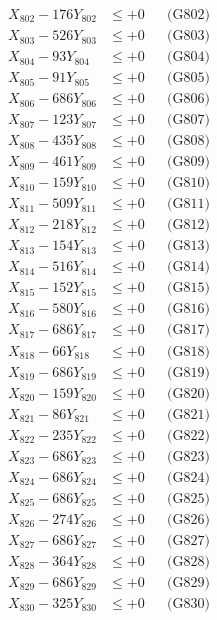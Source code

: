 \documentclass[a4paper,10pt]{article}
\begin{document}
{\begin{align}
X_{802} - 176Y_{802} &\leq +0 && \text{(G802)} \\
X_{803} - 526Y_{803} &\leq +0 && \text{(G803)} \\
X_{804} - 93Y_{804} &\leq +0 && \text{(G804)} \\
X_{805} - 91Y_{805} &\leq +0 && \text{(G805)} \\
X_{806} - 686Y_{806} &\leq +0 && \text{(G806)} \\
X_{807} - 123Y_{807} &\leq +0 && \text{(G807)} \\
X_{808} - 435Y_{808} &\leq +0 && \text{(G808)} \\
X_{809} - 461Y_{809} &\leq +0 && \text{(G809)} \\
X_{810} - 159Y_{810} &\leq +0 && \text{(G810)} \\
\allowbreak
X_{811} - 509Y_{811} &\leq +0 && \text{(G811)} \\
X_{812} - 218Y_{812} &\leq +0 && \text{(G812)} \\
X_{813} - 154Y_{813} &\leq +0 && \text{(G813)} \\
X_{814} - 516Y_{814} &\leq +0 && \text{(G814)} \\
X_{815} - 152Y_{815} &\leq +0 && \text{(G815)} \\
X_{816} - 580Y_{816} &\leq +0 && \text{(G816)} \\
X_{817} - 686Y_{817} &\leq +0 && \text{(G817)} \\
X_{818} - 66Y_{818} &\leq +0 && \text{(G818)} \\
X_{819} - 686Y_{819} &\leq +0 && \text{(G819)} \\
X_{820} - 159Y_{820} &\leq +0 && \text{(G820)} \\
\allowbreak
X_{821} - 86Y_{821} &\leq +0 && \text{(G821)} \\
X_{822} - 235Y_{822} &\leq +0 && \text{(G822)} \\
X_{823} - 686Y_{823} &\leq +0 && \text{(G823)} \\
X_{824} - 686Y_{824} &\leq +0 && \text{(G824)} \\
X_{825} - 686Y_{825} &\leq +0 && \text{(G825)} \\
X_{826} - 274Y_{826} &\leq +0 && \text{(G826)} \\
X_{827} - 686Y_{827} &\leq +0 && \text{(G827)} \\
X_{828} - 364Y_{828} &\leq +0 && \text{(G828)} \\
X_{829} - 686Y_{829} &\leq +0 && \text{(G829)} \\
X_{830} - 325Y_{830} &\leq +0 && \text{(G830)} \\

\end{align}}
\end{document}
